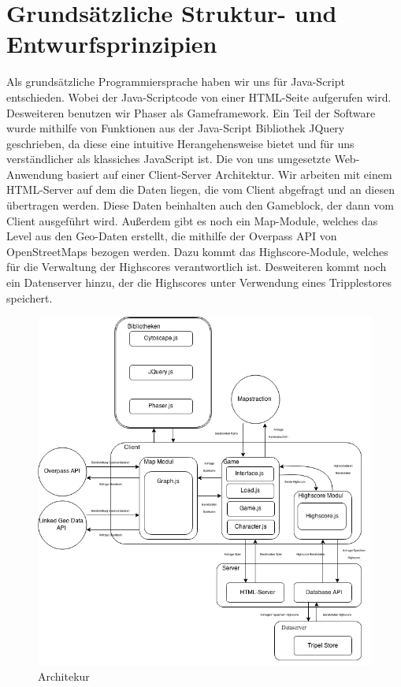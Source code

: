 \documentclass[11pt,a4paper]{article}
\begin{document}
\section{Grundsätzliche Struktur- und Entwurfsprinzipien}
Als grundsätzliche Programmiersprache haben wir uns für Java-Script entschieden. Wobei der Java-Scriptcode von einer HTML-Seite aufgerufen wird. Desweiteren benutzen wir Phaser als Gameframework.
Ein Teil der Software wurde mithilfe von Funktionen aus der Java-Script Bibliothek JQuery geschrieben, da diese eine intuitive Herangehensweise bietet und für uns verständlicher als klassiches JavaScript ist.
Die von uns umgesetzte Web-Anwendung basiert auf einer Client-Server Architektur. Wir arbeiten mit einem HTML-Server auf dem die Daten liegen, die vom Client abgefragt und an diesen übertragen werden. Diese Daten beinhalten auch den Gameblock, der dann vom Client ausgeführt wird. Außerdem gibt es noch ein Map-Module, welches das Level aus den Geo-Daten erstellt, die mithilfe der Overpass API von OpenStreetMaps bezogen werden. Dazu kommt das Highscore-Module, welches für die Verwaltung der Highscores verantwortlich ist.
Desweiteren kommt noch ein Datenserver hinzu, der die Highscores unter Verwendung eines Tripplestores speichert.\\
\begin{figure}[htb]
  \centering
  \includegraphics[scale=0.6]{dia_2.png}
\caption{Architekur}
  \label{arch}
\end{figure} 
\end{document}
